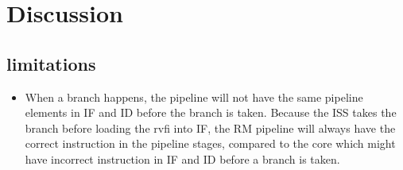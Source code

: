 \chapter{Discussion}


\section{limitations}

\begin{itemize}
    \item When a branch happens, the pipeline will not have the same pipeline elements in IF and ID before the branch is taken. Because the ISS takes the branch before loading the rvfi into IF, the RM pipeline will always have the correct instruction in the pipeline stages, compared to the core which might have incorrect instruction in IF and ID before a branch is taken. 
\end{itemize}